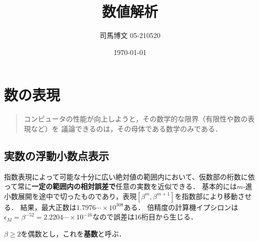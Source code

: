\documentclass[uplatex, dvipdfmx]{jsreport}
\title{数値解析}
\author{司馬博文 05-210520}
\date{\today}
\begin{document}
\tableofcontents

\chapter{数の表現}

\begin{quotation}
    コンピュータの性能が向上しようと，その数学的な限界（有限性や数の表現など）を
    議論できるのは，その母体である数学のみである．
\end{quotation}

\section{実数の浮動小数点表示}

\begin{tcolorbox}[colframe=ForestGreen, colback=ForestGreen!10!white,breakable,colbacktitle=ForestGreen!40!white,coltitle=black,fonttitle=\bfseries\sffamily,
title=]
    指数表現によって可能な十分に広い絶対値の範囲内において、仮数部の桁数に依って常に\textbf{一定の範囲内の相対誤差で}任意の実数を近似できる．
    基本的には$m$-進小数展開を途中で切ったものであり，表現$[\beta^m,\beta^{m+1}]$を指数部により移動させる．
    結果，最大正数は$1.7976\cdots\times 10^{308}$ある．
    倍精度の計算機イプシロンは$\epsilon_M=\beta^{-52}=2.2204\cdots\times 10^{-16}$なので誤差は16桁目から生じる．
\end{tcolorbox}

\begin{notation}
    $\beta\ge 2$を偶数とし，これを\textbf{基数}と呼ぶ．
\end{notation}
\end{document}
